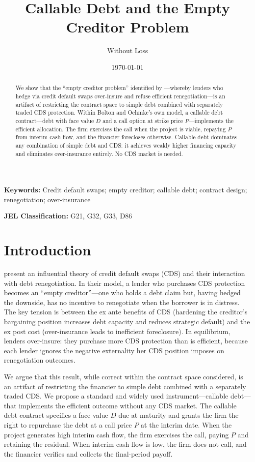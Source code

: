 \documentclass[12pt,a4paper]{article}
\title{Callable Debt and the Empty Creditor Problem}
\author{Without Loss}
\date{\today}
\theoremstyle{plain}
\theoremstyle{definition}
\theoremstyle{remark}
\begin{document}
\maketitle

\begin{abstract}
\noindent
We show that the ``empty creditor problem'' identified by \citet{boltonoehmke2011}---whereby lenders who hedge via credit default swaps over-insure and refuse efficient renegotiation---is an artifact of restricting the contract space to simple debt combined with separately traded CDS protection. Within Bolton and Oehmke's own model, a callable debt contract---debt with face value $D$ and a call option at strike price $P$---implements the efficient allocation. The firm exercises the call when the project is viable, repaying $P$ from interim cash flow, and the financier forecloses otherwise. Callable debt dominates any combination of simple debt and CDS: it achieves weakly higher financing capacity and eliminates over-insurance entirely. No CDS market is needed.
\end{abstract}

\bigskip
\noindent \textbf{Keywords:} Credit default swaps; empty creditor; callable debt; contract design; renegotiation; over-insurance

\bigskip
\noindent \textbf{JEL Classification:} G21, G32, G33, D86

\section{Introduction}

\citet{boltonoehmke2011} present an influential theory of credit default swaps (CDS) and their interaction with debt renegotiation. In their model, a lender who purchases CDS protection becomes an ``empty creditor''---one who holds a debt claim but, having hedged the downside, has no incentive to renegotiate when the borrower is in distress. The key tension is between the ex ante benefits of CDS (hardening the creditor's bargaining position increases debt capacity and reduces strategic default) and the ex post cost (over-insurance leads to inefficient foreclosure). In equilibrium, lenders over-insure: they purchase more CDS protection than is efficient, because each lender ignores the negative externality her CDS position imposes on renegotiation outcomes.

We argue that this result, while correct within the contract space considered, is an artifact of restricting the financier to simple debt combined with a separately traded CDS. We propose a standard and widely used instrument---callable debt---that implements the efficient outcome without any CDS market. The callable debt contract specifies a face value $D$ due at maturity and grants the firm the right to repurchase the debt at a call price $P$ at the interim date. When the project generates high interim cash flow, the firm exercises the call, paying $P$ and retaining the residual. When interim cash flow is low, the firm does not call, and the financier verifies and collects the final-period payoff.
\end{document}

